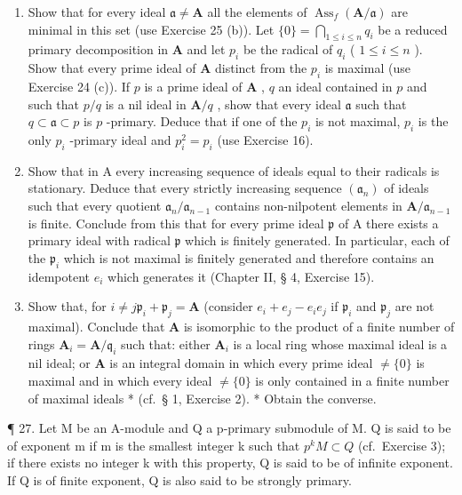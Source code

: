\begin{enumerate}
\def\labelenumi{(\alph{enumi})}
\item
  Show that for every ideal \(\mathfrak{a} \neq \mathbf{A}\) all the elements of \(\operatorname{Ass}_f(\mathbf{A} / \mathfrak{a})\) are minimal in this set (use Exercise 25 (b)). Let \(\{0\} = \bigcap_{1 \leqslant i \leqslant n} q_i\) be a reduced primary decomposition in \(\mathbf{A}\) and let \(p_i\) be the radical of \(q_i\) ( \(1 \leqslant i \leqslant n\) ). Show that every prime ideal of \(\mathbf{A}\) distinct from the \(p_i\) is maximal (use Exercise 24 (c)). If \(p\) is a prime ideal of \(\mathbf{A}\) , \(q\) an ideal contained in \(p\) and such that \(p / q\) is a nil ideal in \(\mathbf{A} / q\) , show that every ideal \(\mathfrak{a}\) such that \(q \subset \mathfrak{a} \subset p\) is \(p\) -primary. Deduce that if one of the \(p_i\) is not maximal, \(p_i\) is the only \(p_i\) -primary ideal and \(p_i^2 = p_i\) (use Exercise 16).
\item
  Show that in A every increasing sequence of ideals equal to their radicals is stationary. Deduce that every strictly increasing sequence \((\mathfrak{a}_n)\) of ideals such that every quotient \(\mathfrak{a}_n / \mathfrak{a}_{n-1}\) contains non-nilpotent elements in \(\mathbf{A} / \mathfrak{a}_{n-1}\) is finite. Conclude from this that for every prime ideal \(\mathfrak{p}\) of A there exists a primary ideal with radical \(\mathfrak{p}\) which is finitely generated. In particular, each of the \(\mathfrak{p}_i\) which is not maximal is finitely generated and therefore contains an idempotent \(e_i\) which generates it (Chapter II, § 4, Exercise 15).
\item
  Show that, for \(i \neq j \mathfrak{p}_i + \mathfrak{p}_j = \mathbf{A}\) (consider \(e_i + e_j - e_i e_j\) if \(\mathfrak{p}_i\) and \(\mathfrak{p}_j\) are not maximal). Conclude that \(\mathbf{A}\) is isomorphic to the product of a finite number of rings \(\mathbf{A}_i = \mathbf{A} / \mathfrak{q}_i\) such that: either \(\mathbf{A}_i\) is a local ring whose maximal ideal is a nil ideal; or \(\mathbf{A}\) is an integral domain in which every prime ideal \(\neq \{0\}\) is maximal and in which every ideal \(\neq\{0\}\) is only contained in a finite number of maximal ideals * (cf.~§ 1, Exercise 2). * Obtain the converse.
\end{enumerate}

¶ 27. Let M be an A-module and Q a p-primary submodule of M. Q is said to be of exponent m if m is the smallest integer k such that \(p^{k}M \subset Q\) (cf.~Exercise 3); if there exists no integer k with this property, Q is said to be of infinite exponent. If Q is of finite exponent, Q is also said to be strongly primary.

